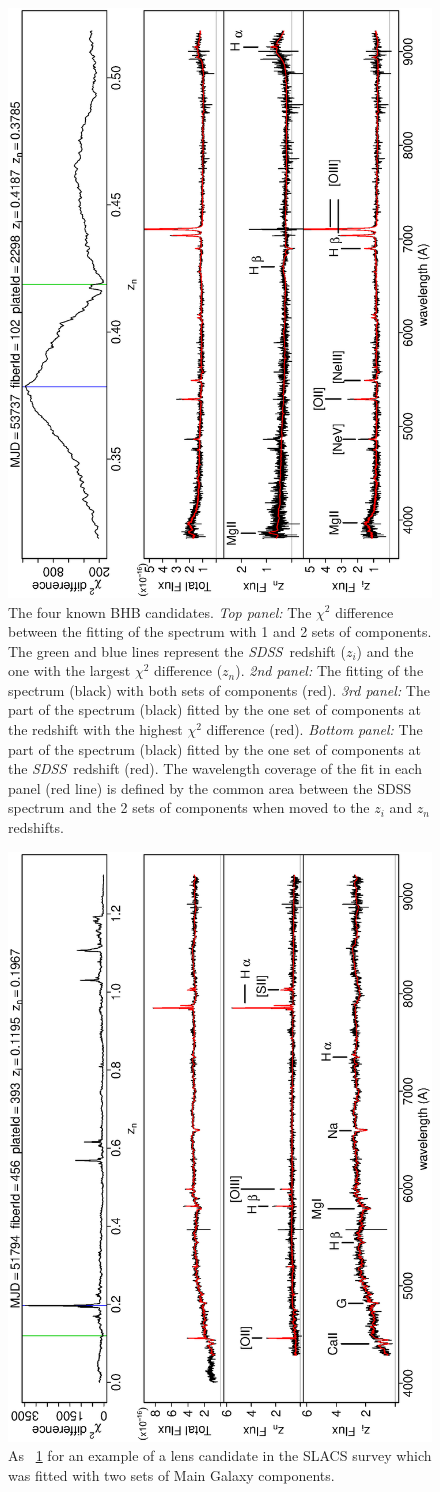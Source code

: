 \documentclass[12pt,preprint]{aastex}
\newcommand{\project}[1]{\textsl{#1}}
\newcommand{\sdss}{\project{SDSS}}
\newcommand{\SDSS}{\sdss}
\begin{document}
\begin{figure}
\includegraphics[angle=-90,width=0.49\columnwidth]{paper_plots/paper_bhb102}
\caption{The four known BHB candidates. \textsl{Top panel:} The
  $\chi^2$ difference between the fitting of the spectrum with 1 and 2
  sets of components. The green and blue lines represent the \SDSS\  
  redshift ($z_i$) and the one with the largest $\chi^2$
  difference ($z_n$). \textsl{2nd panel:} The fitting of the spectrum (black)
  with both sets of components (red). \textsl{3rd panel:} The part of
  the spectrum (black) fitted by the one set of components at the
  redshift with the highest $\chi^2$ difference (red). \textsl{Bottom
    panel:} The part of the spectrum (black) fitted by the one set of
  components at the \SDSS\ redshift (red). The wavelength coverage 
of the fit in each panel (red line) is defined by the common area between the SDSS spectrum and 
the 2 sets of components when moved to the $z_i$ and $z_n$ redshifts.}
\label{fig:6a}
\end{figure}

\clearpage
\begin{figure}
\includegraphics[angle=-90,width=0.49\columnwidth]{paper_plots/paper_13gg}
\caption{As \figurename~\ref{fig:6a} for an example of a lens candidate in the SLACS survey
  which was fitted with two sets of Main Galaxy components.}
\label{fig:6}
\end{figure}
\end{document}
